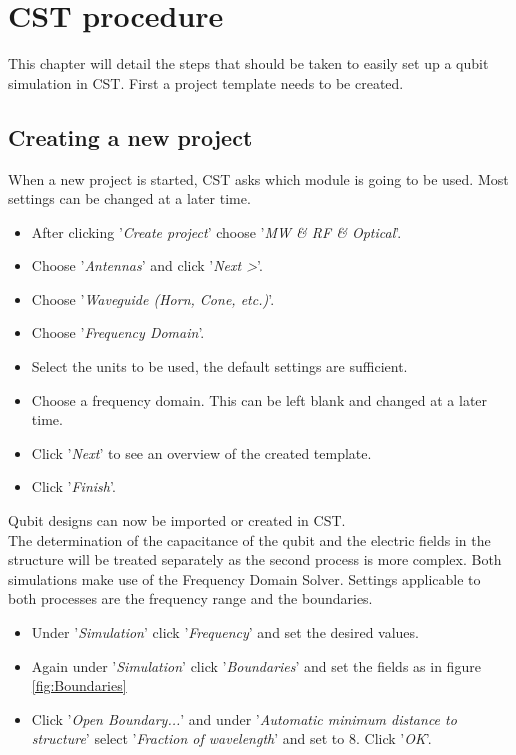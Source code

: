 \chapter{CST procedure}
This chapter will detail the steps that should be taken to easily set up a qubit simulation in CST. First a project template needs to be created.
\section{Creating a new project}
 When a new project is started, CST asks which module is going to be used. Most settings can be changed at a later time.
 \begin{itemize}
 	\item After clicking '\textit{Create project}' choose '\textit{MW \& RF \& Optical}'.
 	\item Choose '\textit{Antennas}' and click '\textit{Next >}'.
 	\item Choose '\textit{Waveguide (Horn, Cone, etc.)}'.
 	\item Choose '\textit{Frequency Domain}'.
 	\item Select the units to be used, the default settings are sufficient.
 	\item Choose a frequency domain. This can be left blank and changed at a later time.
 	\item Click '\textit{Next}' to see an overview of the created template.
 	\item Click '\textit{Finish}'. 
 \end{itemize}
Qubit designs can now be imported or created in CST.\\

The determination of the capacitance of the qubit and the electric fields in the structure will be treated separately as the second process is more complex. Both simulations make use of the Frequency Domain Solver. Settings applicable to both processes are the frequency range and the boundaries. 
\begin{itemize}
	\item Under '\textit{Simulation}' click '\textit{Frequency}' and set the desired values.
	\item Again under '\textit{Simulation}' click '\textit{Boundaries}' and set the fields as in figure \ref{fig:Boundaries}
	\item Click '\textit{Open Boundary...}' and under '\textit{Automatic minimum distance to structure}' select '\textit{Fraction of wavelength}' and set to 8. Click '\textit{OK}'.
\end{itemize}

